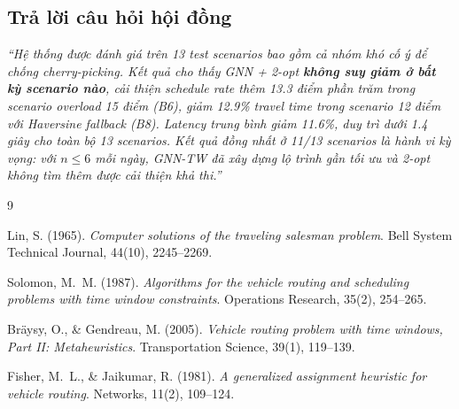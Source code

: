 \documentclass[12pt,a4paper]{article}
\begin{document}
\subsection{Trả lời câu hỏi hội đồng}

\begin{tcolorbox}[colback=blue!3!white, colframe=blue!45!black,
  title={Câu trả lời chuẩn bị sẵn cho hội đồng bảo vệ}]
\textit{``Hệ thống được đánh giá trên 13 test scenarios bao gồm cả nhóm khó cố ý
để chống cherry-picking. Kết quả cho thấy GNN + 2-opt \textbf{không suy giảm ở
bất kỳ scenario nào}, cải thiện schedule rate thêm 13.3 điểm phần trăm trong scenario
overload 15 điểm (B6), giảm 12.9\% travel time trong scenario 12 điểm với Haversine
fallback (B8). Latency trung bình giảm 11.6\%, duy trì dưới 1.4 giây cho toàn bộ
13 scenarios. Kết quả đồng nhất ở 11/13 scenarios là hành vi kỳ vọng: với $n \leq 6$
mỗi ngày, GNN-TW đã xây dựng lộ trình gần tối ưu và 2-opt không tìm thêm được cải
thiện khả thi.''}
\end{tcolorbox}

\begin{thebibliography}{9}

Lin, S. (1965).
\textit{Computer solutions of the traveling salesman problem}.
Bell System Technical Journal, 44(10), 2245--2269.

Solomon, M.~M. (1987).
\textit{Algorithms for the vehicle routing and scheduling problems with time window constraints}.
Operations Research, 35(2), 254--265.

Bräysy, O., \& Gendreau, M. (2005).
\textit{Vehicle routing problem with time windows, Part II: Metaheuristics}.
Transportation Science, 39(1), 119--139.

Fisher, M.~L., \& Jaikumar, R. (1981).
\textit{A generalized assignment heuristic for vehicle routing}.
Networks, 11(2), 109--124.

\end{thebibliography}
\end{document}
